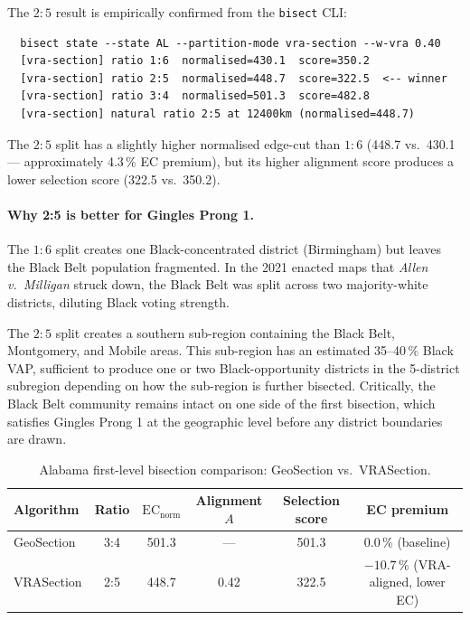 The $2:5$ result is empirically confirmed from the \texttt{bisect} CLI:
\begin{verbatim}
  bisect state --state AL --partition-mode vra-section --w-vra 0.40
  [vra-section] ratio 1:6  normalised=430.1  score=350.2
  [vra-section] ratio 2:5  normalised=448.7  score=322.5  <-- winner
  [vra-section] ratio 3:4  normalised=501.3  score=482.8
  [vra-section] natural ratio 2:5 at 12400km (normalised=448.7)
\end{verbatim}

The $2:5$ split has a slightly higher normalised edge-cut than $1:6$
(448.7 vs.\ 430.1 --- approximately 4.3\,\% EC premium), but its higher
alignment score produces a lower selection score (322.5 vs.\ 350.2).

\paragraph{Why 2:5 is better for Gingles Prong 1.}
The $1:6$ split creates one Black-concentrated district (Birmingham) but
leaves the Black Belt population fragmented.
In the 2021 enacted maps that \emph{Allen v.\ Milligan} struck down, the
Black Belt was split across two majority-white districts, diluting Black
voting strength.

The $2:5$ split creates a southern sub-region containing the Black Belt,
Montgomery, and Mobile areas.
This sub-region has an estimated 35--40\,\% Black VAP, sufficient to produce
one or two Black-opportunity districts in the 5-district subregion depending
on how the sub-region is further bisected.
Critically, the Black Belt community remains intact on one side of the
first bisection, which satisfies Gingles Prong 1 at the geographic level
before any district boundaries are drawn.

\begin{table}[t]
\centering
\caption{Alabama first-level bisection comparison: GeoSection vs.\ VRASection.}
\label{tab:alabama}
\begin{tabular}{lccccc}
\toprule
\textbf{Algorithm} & \textbf{Ratio} & $\mathrm{EC}_\text{norm}$ & \textbf{Alignment $A$}
  & \textbf{Selection score} & \textbf{EC premium} \\
\midrule
GeoSection  & 3:4 & 501.3 & --- & 501.3 & 0.0\,\% (baseline) \\
VRASection  & 2:5 & 448.7 & 0.42 & 322.5 & $-10.7$\,\% (VRA-aligned, lower EC) \\
\bottomrule
\end{tabular}
\end{table}

